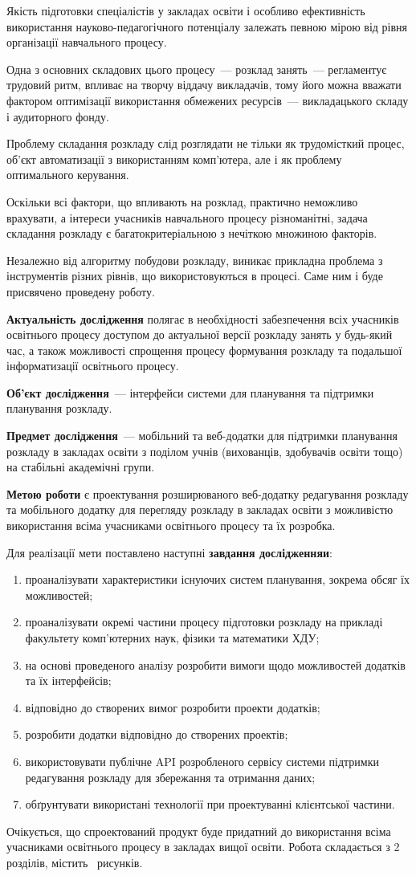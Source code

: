 
Якість підготовки спеціалістів у закладах освіти і особливо ефективність використання науково-педагогічного потенціалу залежать певною мірою від рівня організації навчального процесу.

Одна з основних складових цього процесу~--- розклад занять~--- регламентує трудовий ритм, впливає на творчу віддачу викладачів, тому його можна вважати фактором оптимізації використання обмежених ресурсів~--- викладацького складу і аудиторного фонду.

Проблему складання розкладу слід розглядати не тільки як трудомісткий процес, об'єкт автоматизації з використанням комп’ютера, але і як проблему оптимального керування. 

Оскільки всі фактори, що впливають на розклад, практично неможливо врахувати, а інтереси учасників навчального процесу різноманітні, задача складання розкладу є багатокритеріальною з нечіткою множиною факторів.

Незалежно від алгоритму побудови розкладу, виникає прикладна проблема з інструментів різних рівнів, що використовуються в процесі. Саме ним і буде присвячено проведену роботу.

\textbf{Актуальність дослідження} полягає в необхідності забезпечення всіх учасників освітнього процесу доступом до актуальної версії розкладу занять у будь-який час, а також можливості спрощення процесу формування розкладу та подальшої інформатизації освітнього процесу.

\textbf{Об'єкт дослідження}~--- інтерфейси системи для планування та підтримки планування розкладу.

\textbf{Предмет дослідження}~--- мобільний та веб-додатки для підтримки планування розкладу в закладах освіти з поділом учнів (вихованців, здобувачів освіти тощо) на стабільні академічні групи.

\textbf{Метою роботи} є проектування розширюваного веб-додатку редагування розкладу та мобільного додатку для перегляду розкладу в закладах освіти з можливістю використання всіма учасниками освітнього процесу та їх розробка.

Для реалізації мети поставлено наступні \textbf{завдання дослідженняи}:
\begin{enumerate}
	\item проаналізувати характеристики існуючих систем планування, зокрема обсяг їх можливостей;
	\item проаналізувати окремі частини процесу підготовки розкладу на прикладі факультету комп’ютерних наук, фізики та математики ХДУ;
	\item на основі проведеного аналізу розробити вимоги щодо можливостей додатків та їх інтерфейсів;
	\item відповідно до створених вимог розробити проекти додатків;
	\item розробити додатки відповідно до створених проектів;
	\item використовувати публічне API розробленого сервісу системи підтримки редагування розкладу для збережання та отримання даних;
	\item обґрунтувати використані технології при проектуванні клієнтської частини.
\end{enumerate}

Очікується, що спроектований продукт буде придатний до використання всіма учасниками освітнього процесу в закладах вищої освіти.
Робота складається з 2 розділів, містить \totalfigures\ рисунків.
